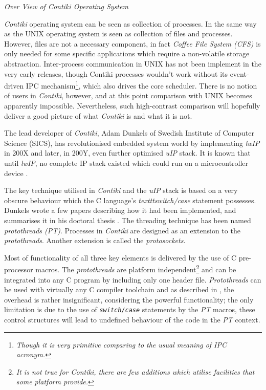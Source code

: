 \emph{Over View of Contiki Operating System} \label{sec:contiki:general}

  \emph{Contiki} operating system can be seen as collection of processes.
 In the same way as the UNIX operating system is seen as collection of
 files and processes. However, files are not a necessary component, in
 fact \emph{Coffee File System (CFS)} is only needed for some specific
 applications which require a non-volatile storage abstraction. 
  Inter-process communication in UNIX has not been implement in the very
 early releases, though Contiki processes wouldn't work without its  
 event-driven IPC mechanism\footnote{\emph{Though it is very primitive
 comparing to the usual meaning of IPC acronym.}}, which also drives the
 core scheduler. There is no notion of users in \emph{Contiki}, however,
 and at this point comparison with UNIX becomes apparently impossible.
 Nevertheless, such high-contrast comparison will hopefully deliver
 a good picture of what \emph{Contiki} is and what it is not.


  The lead developer of \emph{Contiki}, Adam Dunkels of Swedish Institute
 of Computer Science (SICS), has revolutionised embedded system world by
 implementing \emph{lwIP} in 200X and later, in 200Y, even further optimised
 \emph{uIP} stack. It is known that until \emph{lwIP}, no complete IP stack
 existed which could run on a microcontroller device \cite{dunkels03full}.

  The key technique utilised in \emph{Contiki} and the \emph{uIP} stack
 is based on a very obscure behaviour which the C language's \emph{
 texttt{switch/case}} statement possesses. Dunkels wrote a few papers
 \cite{dunkels05protothreads,dunkels06protothreads} describing how it
 had been implemented, and summarises it in his doctoral thesis
 \cite{dunkels07programming}. The threading technique has been named
 \emph{protothreads (PT)}. Processes in \emph{Contiki} are designed as
 an extension to the \emph{protothreads}. Another extension is called
 the \emph{protosockets}.

  Most of functionality of all three key elements is delivered by the use
 of C pre-processor macros. The \emph{protothreads} are platform
 independent\footnote{\emph{It is not true for Contiki, there are few
 additions which utilise facilities that some platform provide.}} and can
 be integrated into any C program by including only one header file.
 \emph{Protothreads} can be used with virtually any C compiler toolchain and
 as described in \cite{dunkels06protothreads}, the overhead is rather
 insignificant, considering the powerful functionality; the only limitation
 is due to the use of \emph{\texttt{switch/case}} statements by the \emph{PT}
 macros, these control structures will lead to undefined behaviour of the
 code in the \emph{PT} context.

